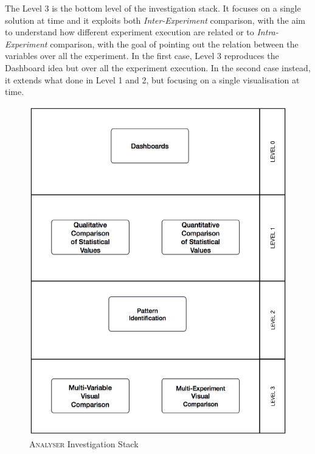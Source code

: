 The Level 3 is the bottom level of the investigation stack. It focuses on a single solution at time and it exploits both \textit{Inter-Experiment} comparison, with the aim to understand how different experiment execution are related or to  \textit{Intra-Experiment} comparison, with the goal of pointing out the relation between the variables over all the experiment. In the first case, Level 3 reproduces the Dashboard idea but over all the experiment execution. In the second case instead, it extends what done in Level 1 and 2, but focusing on a single visualisation at time.

\begin{figure}[htb]
  \centering
	\includegraphics[width=0.8\linewidth]{images/analysis-method}
	\caption{\textsc{Analyser} Investigation Stack}
  	\label{fig:analysis-method}
\end{figure}



